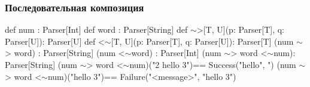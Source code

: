 \documentclass{beamer}
\newcommand{\mytilde}{$\sim$}
\begin{document}
\begin{frame}[fragile]
  \frametitle{Последовательная композиция}
  \begin{semiverbatim}
def num : Parser[Int]
def word : Parser[String]
\pause
def \mytilde>[T, U](p: Parser[T], q: Parser[U]): Parser[U]
def <\mytilde[T, U](p: Parser[T], q: Parser[U]): Parser[T]
\pause
(num \mytilde> word) : Parser[String]
(num <\mytilde word) : Parser[Int]
\pause
(num \mytilde> word <\mytilde num)\pause : Parser[String]
\pause
(num \mytilde> word <\mytilde num)("2 hello 3")\pause == Success("hello", ")
\pause
(num \mytilde> word <\mytilde num)("hello 3")\pause == Failure("<message>",
                                           "hello 3")
  \end{semiverbatim}
\end{frame}
\end{document}
